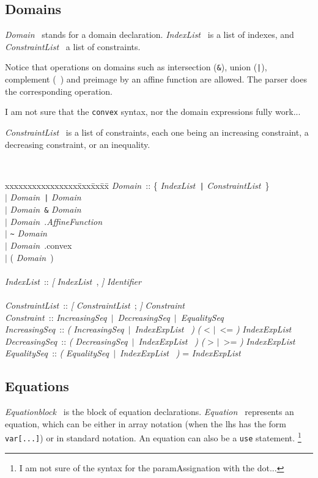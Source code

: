 \documentclass[12pt]{article}
\newcommand{\Opt}[1]{{\rm\sl [} #1 {\rm\sl ]}}
\newcommand{\Group}[1]{{\rm\sl (} #1 {\rm\sl )}}
\newcommand{\Alt}{$\mid$}
\newcommand{\EquationBlock}{{\sl Equationblock\ }}
\newcommand{\Domain}{{\sl Domain\ }}
\newcommand{\Identifier}{{\sl Identifier\ }}
\newcommand{\IndexList}{{\sl IndexList\ }}
\newcommand{\ConstraintList}{{\sl ConstraintList\ }}
\newcommand{\AffineFunction}{{\sl AffineFunction\ }}
\newcommand{\Constraint}{{\sl Constraint\ }}
\newcommand{\IncreasingSeq}{{\sl IncreasingSeq\ }}
\newcommand{\DecreasingSeq}{{\sl DecreasingSeq\ }}
\newcommand{\EqualitySeq}{{\sl EqualitySeq\ }}
\newcommand{\IndexExpList}{{\sl IndexExpList\ }}
\newcommand{\Equation}{{\sl Equation\ }}
\begin{document}
\subsection{Domains}
\Domain{} stands for a domain declaration. \IndexList{} is
a list of indexes, and \ConstraintList{} a list of constraints. 

Notice that operations on domains such as intersection
(\texttt{\&}), union (\texttt{|}), complement (\texttt{~}) and
preimage by an affine function are allowed. The parser 
does the corresponding operation. 

I am not sure that the \texttt{convex} syntax, nor the 
domain expressions fully work...

\ConstraintList{} is a list of constraints, each one being an
increasing constraint, a decreasing constraint, or an 
inequality.
{\tt
\begin{tabbing}
xxxxxxxxxxxxxxxx\= xxx\= xx\=  xx\= \kill
\Domain \>::\>\> \{ \IndexList \verb~|~ \ConstraintList \}\\
\>\>\Alt\> \Domain \verb~|~ \Domain\\
\>\>\Alt\> \Domain \verb~&~ \Domain\\
\>\>\Alt\> \Domain .\AffineFunction\\
\>\>\Alt\> \verb'~' \Domain\\
\>\>\Alt\> \Domain .convex\\
\>\>\Alt\> ( \Domain )\\
\\
\IndexList\>::\>\> \Opt{\IndexList ,} \Identifier\\
\\
\ConstraintList\>::\>\> \Opt{\ConstraintList ;} \Constraint\\
\Constraint \>::\>\> \IncreasingSeq \Alt\ \DecreasingSeq \Alt\ \EqualitySeq\\
\IncreasingSeq \>::\>\> \Group{ \IncreasingSeq \Alt\ \IndexExpList }
  \Group{ < \Alt\ <= } \IndexExpList\\
\DecreasingSeq \>::\>\> \Group{ \DecreasingSeq \Alt\ \IndexExpList }
  \Group{ > \Alt\ >= } \IndexExpList\\
\EqualitySeq\>::\>\> \Group{ \EqualitySeq \Alt\ \IndexExpList } = \IndexExpList
\end{tabbing}
}

\subsection{Equations}
\EquationBlock{} is the block of equation declarations. 
\Equation{} represents an equation, which can be either 
in array notation (when the lhs has the form \texttt{var[...]})
or in standard notation. An equation can also be a \texttt{use} statement.
\footnote{I am not sure of the syntax for the 
paramAssignation with the dot...}
\end{document}

